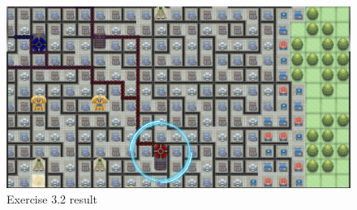 \documentclass[10pt,a4paper]{article}
\begin{document}
\begin{figure}
\centering
\includegraphics[scale=0.2]{img/exercise4}
\caption{Exercise 3.2 result}
\label{img:Ex3-2}
\end{figure}
\end{document}
